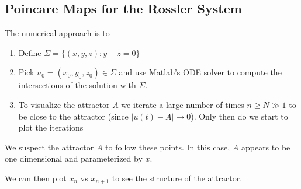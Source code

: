 \documentclass[12pt]{report}
\newcommand{\abs}[1]{\left\vert #1 \right\vert}
\begin{document}
\subsection{Poincare Maps for the Rossler System}

The numerical approach is to
\begin{enumerate}
    \item Define $\Sigma = \{(x, y, z): y + z = 0\}$
    \item Pick $u_0 = (x_0, y_0, z_0) \in \Sigma$ and use Matlab's ODE solver to compute the intersections of the solution with $\Sigma$.
    \item To visualize the attractor $A$ we iterate a large number of times $n \geq N \gg 1$ to be close to the attractor (since $\abs{u(t) - A} \to 0$). Only then do we start to plot the iterations
\end{enumerate}

\begin{center}
\end{center}

We suspect the attractor $A$ to follow these points. In this case, $A$ appears to be one dimensional and parameterized by $x$.

We can then plot $x_n$ vs $x_{n+1}$ to see the structure of the attractor.
\end{document}

